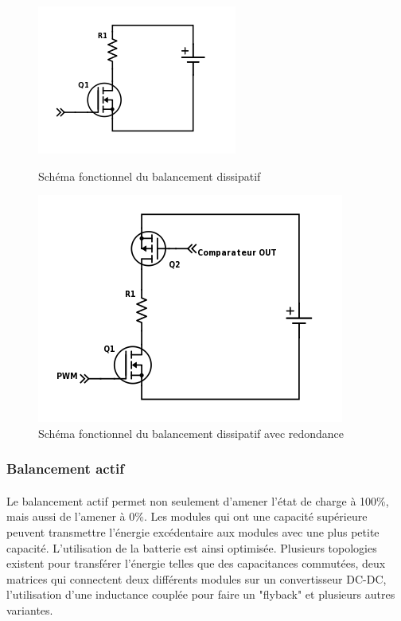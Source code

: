 \begin{figure}[H]
	\begin{minipage}{0.5\textwidth}
		\centering
		\includegraphics[scale=0.9]{Images/Dissipative_balancing.png}
		\caption{Schéma fonctionnel du balancement dissipatif}
		\label{fig:bal_dis}
	\end{minipage}
	\hfill
	\begin{minipage}{0.45\textwidth}
		\centering
		\includegraphics[scale=0.6]{Images/Dissipative_bal_comp.png}
		\caption{Schéma fonctionnel du balancement dissipatif avec redondance}
		\label{fig:bal_dis_comp}
	\end{minipage}
\end{figure}

\subsubsection*{Balancement actif}
\paragraph*{}
Le balancement actif permet non seulement d'amener l'état de charge à 100\%, mais aussi de l'amener à 0\%. Les modules qui ont une capacité supérieure peuvent transmettre l'énergie excédentaire aux modules avec une plus petite capacité. L'utilisation de la batterie est ainsi optimisée. Plusieurs topologies existent pour transférer l'énergie telles que des capacitances commutées, deux matrices qui connectent deux différents modules sur un convertisseur DC-DC, l'utilisation d'une inductance couplée pour faire un "flyback" et plusieurs autres variantes.

